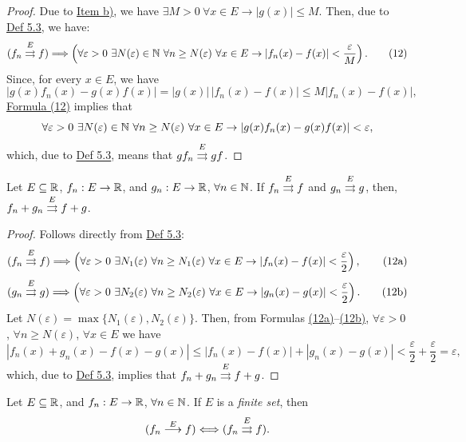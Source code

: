 \begin{proof}
Due to \hyperref[item:claim:6.7:b]{Item b)}, we have $\exists M>0\ \forall x\in E\to |g(x)|\leq M$.
Then, due to \hyperref[def:5.3]{Def 5.3}, we have:
\[
(f_n\mathrel{\overset{E}{\rightrightarrows}}f)
\Longrightarrow
\left(\forall\varepsilon>0\ \exists N(\varepsilon)\in\mathbb{N}\ \forall n\geq N(\varepsilon)\ \forall x\in E
\to |f_n(x)-f(x)|<\frac{\varepsilon}{M}\right).
\tag{12}\label{eq:6:12:1}
\]
Since, for every $x\in E$, we have
\[
|g(x)f_n(x)-g(x)f(x)|=|g(x)|\,|f_n(x)-f(x)|\leq M|f_n(x)-f(x)|,
\]
\hyperref[eq:6:12:1]{Formula (12)} implies that
\[
\forall\varepsilon>0\ \exists N(\varepsilon)\in\mathbb{N}\ \forall n\geq N(\varepsilon)\ \forall x\in E
\to |g(x)f_n(x)-g(x)f(x)|<\varepsilon,
\]
which, due to \hyperref[def:5.3]{Def 5.3}, means that $g f_n\mathrel{\overset{E}{\rightrightarrows}}g f$.
\end{proof}

\begin{claim}\label{claim:6.8}
Let $E\subseteq\mathbb{R}$, $f_n:E\to\mathbb{R}$, and $g_n:E\to\mathbb{R}$, $\forall n\in\mathbb{N}$.
If $f_n\mathrel{\overset{E}{\rightrightarrows}}f$ and $g_n\mathrel{\overset{E}{\rightrightarrows}}g$, then, $f_n+g_n\mathrel{\overset{E}{\rightrightarrows}}f+g$.
\end{claim}

\begin{proof}
Follows directly from \hyperref[def:5.3]{Def 5.3}:
\[
(f_n\mathrel{\overset{E}{\rightrightarrows}}f)
\Longrightarrow
\left(\forall\varepsilon>0\ \exists N_1(\varepsilon)\ \forall n\geq N_1(\varepsilon)\ \forall x\in E
\to |f_n(x)-f(x)|<\frac{\varepsilon}{2}\right),
\tag{12a}\label{eq:6:12a:1}
\]
\[
(g_n\mathrel{\overset{E}{\rightrightarrows}}g)
\Longrightarrow
\left(\forall\varepsilon>0\ \exists N_2(\varepsilon)\ \forall n\geq N_2(\varepsilon)\ \forall x\in E
\to |g_n(x)-g(x)|<\frac{\varepsilon}{2}\right).
\tag{12b}\label{eq:6:12b:1}
\]
Let $N(\varepsilon)=\max\{N_1(\varepsilon),N_2(\varepsilon)\}$.
Then, from Formulas \hyperref[eq:6:12a:1]{(12a)}--\hyperref[eq:6:12b:1]{(12b)}, $\forall\varepsilon>0$, $\forall n\geq N(\varepsilon)$, $\forall x\in E$ we have
\[
|f_n(x)+g_n(x)-f(x)-g(x)|
\leq |f_n(x)-f(x)|+|g_n(x)-g(x)|
<\frac{\varepsilon}{2}+\frac{\varepsilon}{2}=\varepsilon,
\]
which, due to \hyperref[def:5.3]{Def 5.3}, implies that $f_n+g_n\mathrel{\overset{E}{\rightrightarrows}}f+g$.
\end{proof}

\begin{claim}\label{claim:6.9}
Let $E\subseteq\mathbb{R}$, and $f_n:E\to\mathbb{R}$, $\forall n\in\mathbb{N}$.
If $E$ is a \emph{finite set}, then
\[
(f_n\mathrel{\overset{E}{\longrightarrow}}f)\Longleftrightarrow(f_n\mathrel{\overset{E}{\rightrightarrows}}f).
\]
\end{claim}

